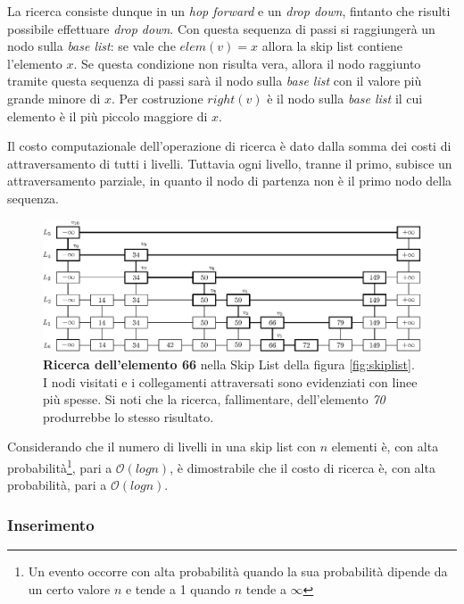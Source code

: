 			La ricerca consiste dunque in un \textit{hop forward} e un \textit{drop down}, fintanto che risulti possibile effettuare \textit{drop down}.  Con questa sequenza di passi si raggiungerà un nodo sulla \textit{base list}: se vale che $ elem(v) = x $ allora la skip list contiene l'elemento $ x $. Se questa condizione non risulta vera, allora il nodo raggiunto tramite questa sequenza di passi sarà il nodo sulla \textit{base list} con il valore più grande minore di $ x $. Per costruzione $ right(v) $ è il nodo sulla \textit{base list} il cui elemento è il più piccolo maggiore di $ x $.
			
			Il costo computazionale dell'operazione di ricerca è dato dalla somma dei costi di attraversamento di tutti i livelli. Tuttavia ogni livello, tranne il primo, subisce un attraversamento parziale, in quanto il nodo di partenza non è il primo nodo della sequenza.
			
			
			\begin{figure}
				\centering
				\includegraphics[scale=0.6]{figure/search-66.eps}
				\caption{\textbf{Ricerca dell'elemento 66} nella Skip List della figura \ref{fig:skiplist}. I nodi visitati e i collegamenti attraversati sono evidenziati con linee più spesse. Si noti che la ricerca, fallimentare, dell'elemento \textit{70} produrrebbe lo stesso risultato.}\label{fig:2}
			\end{figure}
			
			Considerando che il numero di livelli in una skip list con $ n $ elementi è, con alta probabilità\footnote{Un evento occorre con alta probabilità quando la sua probabilità dipende da un certo valore $ n $ e tende a 1 quando $ n $ tende a $\infty$}, pari a $\mathcal{O}(log{}n)$, è dimostrabile che il costo di ricerca è, con alta probabilità, pari a $\mathcal{O}(log{}n)$.
				
		\subsubsection{Inserimento}
		
